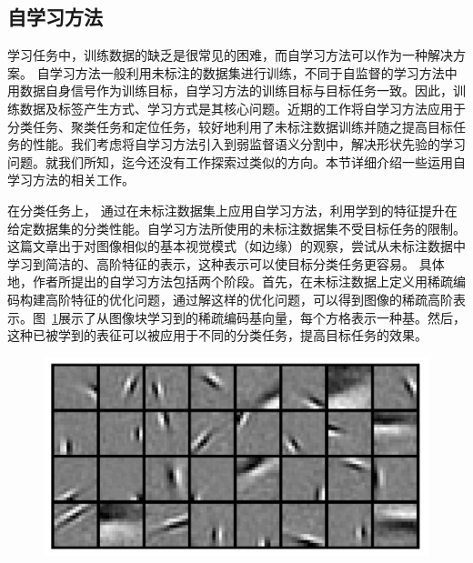 \subsection{自学习方法} \label{sec:rel_stl}
学习任务中，训练数据的缺乏是很常见的困难，而自学习方法可以作为一种解决方案。
自学习方法一般利用未标注的数据集进行训练，不同于自监督的学习方法中用数据自身信号作为训练目标，自学习方法的训练目标与目标任务一致。因此，训练数据及标签产生方式、学习方式是其核心问题。近期的工作将自学习方法应用于分类任务\citep{raina2007self,wang2013robust,feng2020autoencoder}、聚类任务\citep{li2017self,dai2008self,}和定位任务\citep{bazzani2016self,jie2017deep}，较好地利用了未标注数据训练并随之提高目标任务的性能。我们考虑将自学习方法引入到弱监督语义分割中，解决形状先验的学习问题。就我们所知，迄今还没有工作探索过类似的方向。本节详细介绍一些运用自学习方法的相关工作。

在分类任务上，\citet{raina2007self} 通过在未标注数据集上应用自学习方法，利用学到的特征提升在给定数据集的分类性能。自学习方法所使用的未标注数据集不受目标任务的限制。这篇文章出于对图像相似的基本视觉模式（如边缘）的观察，尝试从未标注数据中学习到简洁的、高阶特征的表示，这种表示可以使目标分类任务更容易。
具体地，作者所提出的自学习方法包括两个阶段。首先，在未标注数据上定义用稀疏编码构建高阶特征的优化问题，通过解这样的优化问题，可以得到图像的稀疏高阶表示。图~\ref{c2_fig7}展示了从图像块学习到的稀疏编码基向量，每个方格表示一种基。然后，这种已被学到的表征可以被应用于不同的分类任务，提高目标任务的效果。
    \begin{figure}[tbp]
        \centering 
        \includegraphics[width=1.0\textwidth]{img/c2/rel_b1.png}
        \label{c2_fig7}
    \end{figure}



